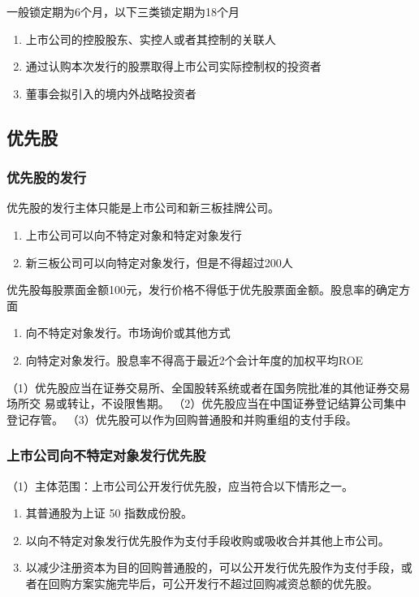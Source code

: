 \documentclass[UTF8,12pt]{ctexart}
\numberwithin{equation}{section} %
\numberwithin{figure}{section}
\numberwithin{table}{section}
\begin{document}
	一般锁定期为6个月，以下三类锁定期为18个月
	\begin{enumerate}
		\item 上市公司的控股股东、实控人或者其控制的关联人
		
		\item 通过认购本次发行的股票取得上市公司实际控制权的投资者
		
		\item 董事会拟引入的境内外战略投资者
	\end{enumerate}
	
	\subsection{优先股}
	
	\subsubsection{优先股的发行}
	优先股的发行主体只能是上市公司和新三板挂牌公司。
	\begin{enumerate}
		\item 上市公司可以向不特定对象和特定对象发行
		
		\item 新三板公司可以向特定对象发行，但是不得超过200人
	\end{enumerate}
	
	优先股每股票面金额100元，发行价格不得低于优先股票面金额。股息率的确定方面
	\begin{enumerate}
		\item 向不特定对象发行。市场询价或其他方式
		
		\item 向特定对象发行。股息率不得高于最近2个会计年度的加权平均ROE
	\end{enumerate}
	
	（1）优先股应当在证券交易所、全国股转系统或者在国务院批准的其他证券交易场所交
	易或转让，不设限售期。
	（2）优先股应当在中国证券登记结算公司集中登记存管。
	（3）优先股可以作为回购普通股和并购重组的支付手段。
	
	
	\subsubsection{上市公司向不特定对象发行优先股}
	（1）主体范围：上市公司公开发行优先股，应当符合以下情形之一。
	\begin{enumerate}
		\item 其普通股为上证 50 指数成份股。
		
		\item 以向不特定对象发行优先股作为支付手段收购或吸收合并其他上市公司。
		
		\item 以减少注册资本为目的回购普通股的，可以公开发行优先股作为支付手段，或者在回购方案实施完毕后，可公开发行不超过回购减资总额的优先股。
	\end{enumerate}
	
\end{document}
